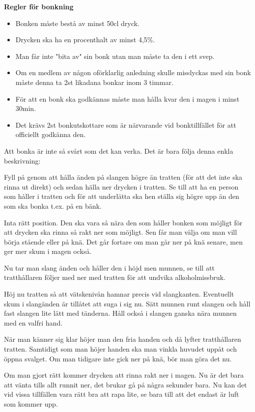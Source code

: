 \textbf{Regler för bonkning}

\begin{itemize}
  \item Bonken måste bestå av minst 50cl dryck.
  \item Drycken ska ha en procenthalt av minst 4,5\%.
  \item Man får inte "bita av" sin bonk utan man måste ta den i ett svep.
  \item Om en medlem av någon oförklarlig anledning skulle misslyckas med sin bonk måste denna ta 2st likadana bonkar inom 3 timmar.
  \item För att en bonk ska godkännas måste man hålla kvar den i magen i minst 30min.
  \item Det krävs 2st bonkutskottare som är närvarande vid bonktillfället för att officiellt godkänna den.
\end{itemize}\newpage


Att bonka är inte så svårt som det kan verka. Det är bara följa denna enkla beskrivning:

Fyll på genom att hålla änden på slangen högre än tratten (för att det inte ska rinna ut direkt) och sedan hälla ner drycken i tratten. Se till att ha en person som håller i tratten och för att underlätta ska hen ställa sig högre upp än den som ska bonka t.ex. på en bänk.

Inta rätt position. Den ska vara så nära den som håller bonken som möjligt för att drycken ska rinna så rakt ner som möjligt. Sen får man välja om man vill börja stående eller på knä. Det går fortare om man går ner på knä senare, men ger mer skum i magen också.

Nu tar man slang änden och håller den i höjd men munnen, se till att tratthållaren följer med ner med tratten för att undvika alkoholmissbruk.

Höj nu tratten så att vätskenivån hamnar precis vid slangkanten. Eventuellt skum i slangänden är tillåtet att suga i sig nu. Sätt munnen runt slangen och håll fast slangen lite lätt med tänderna. Håll också i slangen ganska nära munnen med en valfri hand.

När man känner sig klar höjer man den fria handen och då lyfter tratthållaren tratten. Samtidigt som man höjer handen ska man vinkla huvudet uppåt och öppna svalget. Om man tidigare inte gick ner på knä, bör man göra det nu.

Om man gjort rätt kommer drycken att rinna rakt ner i magen. Nu är det bara att vänta tills allt runnit ner, det brukar gå på några sekunder bara. Nu kan det vid vissa tillfällen vara rätt bra att rapa lite, se bara till att det endast är luft som kommer upp.

